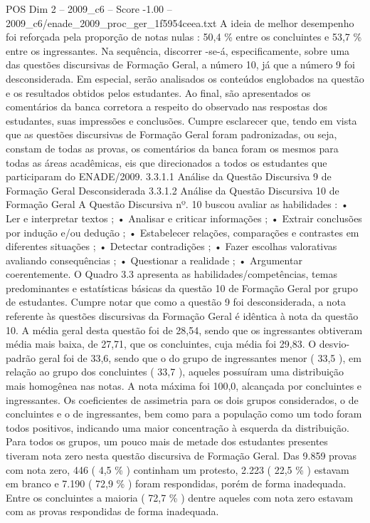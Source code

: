 \begin{textsample}{POS Dim 2 – 2009\_c6 – Score -1.00 – 2009\_c6/enade\_2009\_proc\_ger\_1f5954ceea.txt}
A ideia de melhor desempenho foi reforçada pela proporção de notas nulas : 50,4 \% entre os concluintes e 53,7 \% entre os ingressantes.
Na sequência, discorrer -se-á, especificamente, sobre uma das questões discursivas de Formação Geral, a número 10, já que a número 9 foi desconsiderada.
Em especial, serão analisados os conteúdos englobados na questão e os resultados obtidos pelos estudantes.
Ao final, são apresentados os comentários da banca corretora a respeito do observado nas respostas dos estudantes, suas impressões e conclusões.
Cumpre esclarecer que, tendo em vista que as questões discursivas de Formação Geral foram padronizadas, ou seja, constam de todas as provas, os comentários da banca foram os mesmos para todas as áreas acadêmicas, eis que direcionados a todos os estudantes que participaram do ENADE/2009. 3.3.1.1 Análise da Questão Discursiva 9 de Formação Geral Desconsiderada 3.3.1.2 Análise da Questão Discursiva 10 de Formação Geral A Questão Discursiva nº. 10 buscou avaliar as habilidades : • Ler e interpretar textos ; • Analisar e criticar informações ; • Extrair conclusões por indução e/ou dedução ; • Estabelecer relações, comparações e contrastes em diferentes situações ; • Detectar contradições ; • Fazer escolhas valorativas avaliando consequências ; • Questionar a realidade ; • Argumentar coerentemente.
O Quadro 3.3 apresenta as habilidades/competências, temas predominantes e estatísticas básicas da questão 10 de Formação Geral por grupo de estudantes.
Cumpre notar que como a questão 9 foi desconsiderada, a nota referente às questões discursivas da Formação Geral é idêntica à nota da questão 10.
A média geral desta questão foi de 28,54, sendo que os ingressantes obtiveram média mais baixa, de 27,71, que os concluintes, cuja média foi 29,83.
O desvio-padrão geral foi de 33,6, sendo que o do grupo de ingressantes menor ( 33,5 ), em relação ao grupo dos concluintes ( 33,7 ), aqueles possuíram uma distribuição mais homogênea nas notas.
A nota máxima foi 100,0, alcançada por concluintes e ingressantes.
Os coeficientes de assimetria para os dois grupos considerados, o de concluintes e o de ingressantes, bem como para a população como um todo foram todos positivos, indicando uma maior concentração à esquerda da distribuição.
Para todos os grupos, um pouco mais de metade dos estudantes presentes tiveram nota zero nesta questão discursiva de Formação Geral.
Das 9.859 provas com nota zero, 446 ( 4,5 \% ) continham um protesto, 2.223 ( 22,5 \% ) estavam em branco e 7.190 ( 72,9 \% ) foram respondidas, porém de forma inadequada.
Entre os concluintes a maioria ( 72,7 \% ) dentre aqueles com nota zero estavam com as provas respondidas de forma inadequada.

\end{textsample}
